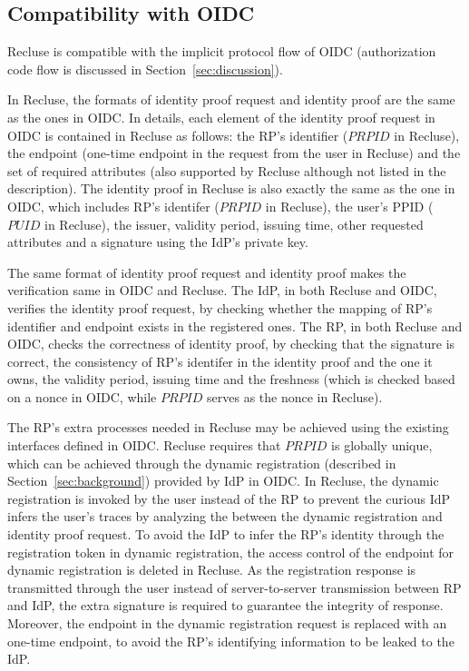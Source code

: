 \subsection{Compatibility with OIDC}
\label{subsec:compatible}
Recluse is compatible with the implicit protocol flow of OIDC (authorization code flow is discussed in Section~\ref{sec:discussion}).

In Recluse, the formats of identity proof request and identity proof are the same as the ones in OIDC. In details, each element of the identity proof request in OIDC is contained in Recluse as follows: the RP's identifier ($PRPID$ in Recluse), the endpoint (one-time endpoint in the request from the user in Recluse) and the set of required attributes (also supported by Recluse although not listed in the description). The identity proof in Recluse is also exactly the same as the one in OIDC, which includes RP's identifer ($PRPID$ in Recluse), the user's PPID ($PUID$ in Recluse), the issuer, validity period, issuing time, other requested attributes and a signature using the IdP's private key.

The same format of identity proof request and identity proof makes the verification same in OIDC and Recluse. The IdP, in both Recluse and OIDC, verifies the identity proof request, by checking whether the mapping of RP's identifier and endpoint exists in the registered ones. The RP, in both Recluse and OIDC, checks the correctness of identity proof, by checking that the signature is correct, the consistency of RP's identifer in the identity proof and the one it owns, the validity period, issuing time and the freshness (which is checked based on a nonce in  OIDC, while  $PRPID$ serves as the nonce in Recluse).

The RP's extra processes needed in Recluse may be achieved using the existing interfaces defined in OIDC.  Recluse requires that $PRPID$ is globally unique, which can be achieved through the dynamic registration (described in Section~\ref{sec:background}) provided by IdP in OIDC. In Recluse, the dynamic registration is invoked by the user instead of the RP to prevent the curious IdP infers the user's traces by analyzing the between the dynamic registration and identity proof request. To avoid the IdP to infer the RP's identity through the registration token in dynamic registration, the access control of the endpoint for dynamic registration is deleted in Recluse. As the registration response is transmitted through the user instead of server-to-server transmission between RP and IdP, the extra signature is required to guarantee the integrity of response. Moreover, the endpoint in the dynamic registration request is replaced with an one-time endpoint, to avoid the RP's identifying information to be leaked to the IdP.



